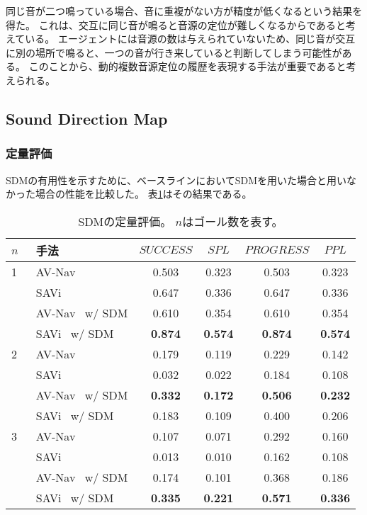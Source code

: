 同じ音が二つ鳴っている場合、音に重複がない方が精度が低くなるという結果を得た。
これは、交互に同じ音が鳴ると音源の定位が難しくなるからであると考えている。
エージェントには音源の数は与えられていないため、同じ音が交互に別の場所で鳴ると、一つの音が行き来していると判断してしまう可能性がある。
このことから、動的複数音源定位の履歴を表現する手法が重要であると考えられる。



\subsection{Sound Direction Map}

\subsubsection{定量評価}

SDMの有用性を示すために、ベースラインにおいてSDMを用いた場合と用いなかった場合の性能を比較した。
表\ref{tab:dm_results}はその結果である。

\begin{table}[tb]
    \setlength{\tabcolsep}{3pt}
    \centering
    \caption{
        SDMの定量評価。
        $n$はゴール数を表す。
    }
    \label{tab:dm_results}
    \begin{tabular}{@{}llcccc@{}}
    \toprule
        $n$~ & 手法 & $SUCCESS$ & $SPL$ & $PROGRESS$ & $PPL$ \\ \midrule
        1 & AV-Nav~\cite{chen2020soundspaces} & 0.503 & 0.323 & 0.503 & 0.323  \\
        & SAVi~\cite{chen2021semantic} & 0.647 & 0.336 & 0.647 & 0.336 \\
        & AV-Nav~\cite{chen2020soundspaces} w/ SDM & 0.610 & 0.354 & 0.610 & 0.354 \\
        & SAVi~\cite{chen2021semantic} w/ SDM & \textbf{0.874} & \textbf{0.574} & \textbf{0.874} & \textbf{0.574} \\ \midrule
        2 & AV-Nav~\cite{chen2020soundspaces} & 0.179 & 0.119 & 0.229 & 0.142  \\
        & SAVi~\cite{chen2021semantic} & 0.032 & 0.022 & 0.184 & 0.108 \\
        & AV-Nav~\cite{chen2020soundspaces} w/ SDM & \textbf{0.332} & \textbf{0.172} & \textbf{0.506} & \textbf{0.232} \\
        & SAVi~\cite{chen2021semantic} w/ SDM & 0.183 & 0.109 & 0.400 & 0.206 \\ \midrule
        3 & AV-Nav~\cite{chen2020soundspaces} & 0.107 & 0.071 & 0.292 & 0.160 \\
        & SAVi~\cite{chen2021semantic} & 0.013 & 0.010 & 0.162 & 0.108 \\
        & AV-Nav~\cite{chen2020soundspaces} w/ SDM & 0.174 & 0.101 & 0.368 & 0.186 \\
        & SAVi~\cite{chen2021semantic} w/ SDM & \textbf{0.335} & \textbf{0.221} & \textbf{0.571} & \textbf{0.336} \\ \bottomrule
    \end{tabular}
\end{table}

